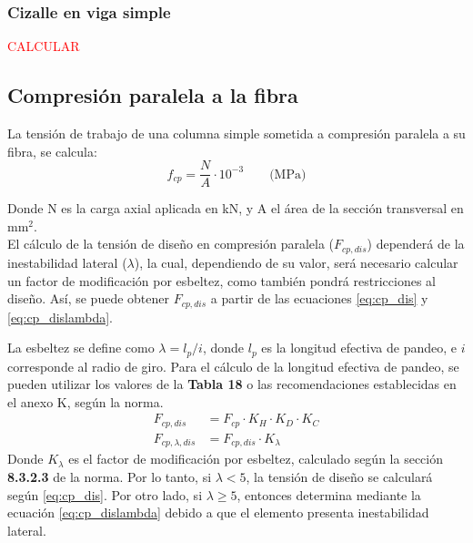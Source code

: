 \subsubsection{Cizalle en viga simple}
\textcolor{red}{CALCULAR}
\subsection{Compresión paralela a la fibra}
La tensión de trabajo de una columna simple sometida a compresión paralela a su fibra, se calcula:
\begin{equation}
	f_{cp}= \frac{N}{A} \cdot 10^{-3} \qquad \text{(MPa)}
\end{equation}

Donde N es la carga axial aplicada en kN, y A el área de la sección transversal en mm$^2$. \\

El cálculo de la tensión de diseño en compresión paralela ($F_{cp,dis}$) dependerá de la inestabilidad lateral ($\lambda$), la cual, dependiendo de su valor, será necesario calcular un factor de modificación por esbeltez, como también pondrá restricciones al diseño. Así, se puede obtener $F_{cp,dis}$ a partir de las ecuaciones \ref{eq:cp_dis} y \ref{eq:cp_dislambda}. 

La esbeltez se define como $\lambda = l_p/i$, donde $l_p$ es la longitud efectiva de pandeo, e $i$ corresponde al radio de giro. Para el cálculo de la longitud efectiva de pandeo, se pueden utilizar los valores de la \textbf{Tabla 18} o las recomendaciones establecidas en el anexo K, según la norma.
\begin{subequations}
\begin{align}
	F_{cp,dis} &= F_{cp} \cdot K_H \cdot K_D \cdot K_C \label{eq:cp_dis}\\
	F_{cp,\lambda,dis} &= F_{cp,dis} \cdot K_{\lambda} \label{eq:cp_dislambda}
\end{align}
\end{subequations}
Donde $K_{\lambda}$ es el factor de modificación por esbeltez, calculado según la sección \textbf{8.3.2.3} de la norma. 
Por lo tanto, si $\lambda < 5$, la tensión de diseño se calculará según \ref{eq:cp_dis}. Por otro lado, si $\lambda \geq 5$, entonces determina mediante la ecuación \ref{eq:cp_dislambda} debido a que el elemento presenta inestabilidad lateral.
